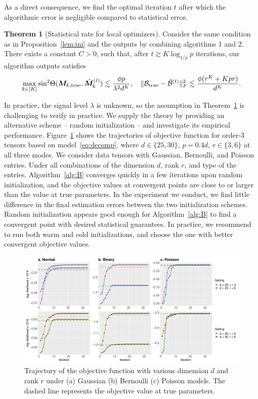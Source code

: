 \documentclass[12pt]{article}
\theoremstyle{definition}
\newtheorem{thm}{Theorem}[section]
\theoremstyle{definition}
\begin{document}
{As a direct consequence, we find the optimal iteration $t$ after which the algorithmic error is negligible compared to statistical error. 
\begin{thm}[Statistical rate for local optimizers]\label{thm:local}Consider the same condition as in Proposition~\ref{lem:ini} and the outputs by combining algorithms 1 and 2. There exists a constant $C>0$, such that, after $t\gtrsim K\log_{1/\rho}p$ iterations, our algorithm outputs satisfies
\[
\max_{k\in[K]}\textup{sin}^2 \Theta(\bm M_{k,\textup{true}}, \hat {\bm M}^{(t)}_k) \lesssim {\phi p\over \lambda^2d^K}, \quad \lVert\mathcal{B}_{\textup{true}}- \hat {\mathcal{B}}^{(t)}\rVert_F^2 \lesssim {\phi(r^K+Kpr)\over d^K}.
\]
\end{thm}
}


In practice, the signal level $\lambda$ is unknown, so the assumption in Theorem~\ref{thm:local} is challenging to verify in practice. We supply the theory by providing an alternative scheme -- random initialization -- and investigate its empirical performance. Figure~\ref{fig:loglike} shows the trajectories of objective function for order-3 tensors based on model~\eqref{eq:decomp}, where $ d \in\{25,30\}$, $p = 0.4d$, $ r\in\{3,6\}$ at all three modes. We consider data tensors with Gaussian, Bernoulli, and Poisson entries. Under all combinations of the dimension $d$, rank $r$, and type of the entries, Algorithm~\ref{alg:B} converges quickly in a few iterations upon random initialization, and the objective values at convergent points are close to or larger than the value at true parameters. In the experiment we conduct, we find little difference in the final estimation errors between the two initialization schemes. Random initialization appears good enough for Algorithm~\ref{alg:B} to find a convergent point with desired statistical guarantees. In practice, we recommend to run both warm and cold initializations, and choose the one with better convergent objective values.  


\begin{figure}[t]
\centering
\includegraphics[width=16cm]{loglike.pdf}
\caption{Trajectory of the objective function with various dimension $d$ and rank $r$ under (a) Gaussian (b) Bernoulli (c) Poisson models. The dashed line represents the objective value at true parameters. }\label{fig:loglike}
\vspace{-.2cm}
\end{figure}
\end{document}
